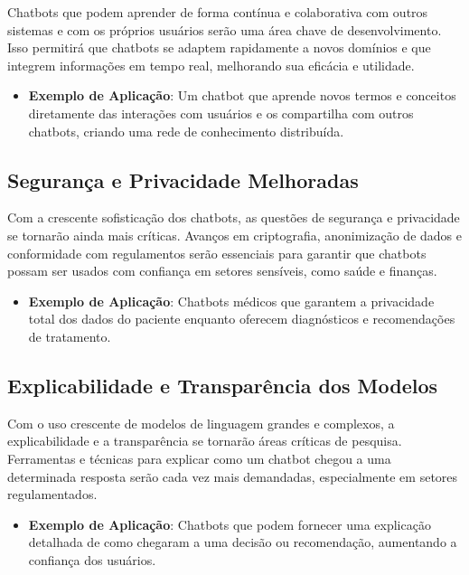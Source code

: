 \documentclass[14pt,a4paper,oneside]{book}
\begin{document}
Chatbots que podem aprender de forma contínua e colaborativa com outros sistemas e com os próprios usuários serão uma área chave de desenvolvimento. Isso permitirá que chatbots se adaptem rapidamente a novos domínios e que integrem informações em tempo real, melhorando sua eficácia e utilidade.

\begin{itemize}
	\item \textbf{Exemplo de Aplicação}: Um chatbot que aprende novos termos e conceitos diretamente das interações com usuários e os compartilha com outros chatbots, criando uma rede de conhecimento distribuída.
\end{itemize}

\subsection{Segurança e Privacidade Melhoradas}

Com a crescente sofisticação dos chatbots, as questões de segurança e privacidade se tornarão ainda mais críticas. Avanços em criptografia, anonimização de dados e conformidade com regulamentos serão essenciais para garantir que chatbots possam ser usados com confiança em setores sensíveis, como saúde e finanças.

\begin{itemize}
	\item \textbf{Exemplo de Aplicação}: Chatbots médicos que garantem a privacidade total dos dados do paciente enquanto oferecem diagnósticos e recomendações de tratamento.
\end{itemize}

\subsection{Explicabilidade e Transparência dos Modelos}

Com o uso crescente de modelos de linguagem grandes e complexos, a explicabilidade e a transparência se tornarão áreas críticas de pesquisa. Ferramentas e técnicas para explicar como um chatbot chegou a uma determinada resposta serão cada vez mais demandadas, especialmente em setores regulamentados.

\begin{itemize}
	\item \textbf{Exemplo de Aplicação}: Chatbots que podem fornecer uma explicação detalhada de como chegaram a uma decisão ou recomendação, aumentando a confiança dos usuários.
\end{itemize}
\end{document}
